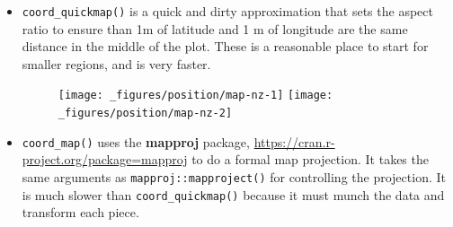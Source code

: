 \begin{itemize}
\item
  \texttt{coord\_quickmap()} is a quick and dirty approximation that
  sets the aspect ratio to ensure than 1m of latitude and 1 m of
  longitude are the same distance in the middle of the plot. These is a
  reasonable place to start for smaller regions, and is very faster.

\begin{Shaded}
\begin{Highlighting}[]
\StringTok{ }\NormalTok{(}\NormalTok{(}\NormalTok{), } 
\StringTok{  }\NormalTok{(} \NormalTok{, } \NormalTok{) +}
\StringTok{  }\NormalTok{(}\NormalTok{) +}\StringTok{ }\NormalTok{(}\NormalTok{)}

\StringTok{ }\NormalTok{()}
\end{Highlighting}
\end{Shaded}

  \begin{figure}[H]
    \centering
    \texttt{[image: \_figures/position/map-nz-1]}%
    \texttt{[image: \_figures/position/map-nz-2]}
  \end{figure}
\item
  \texttt{coord\_map()} uses the \textbf{mapproj} package,
  \url{https://cran.r-project.org/package=mapproj} to do a formal map
  projection. It takes the same arguments as
  \texttt{mapproj::mapproject()} for controlling the projection. It is
  much slower than \texttt{coord\_quickmap()} because it must munch the
  data and transform each piece.

\begin{Shaded}
\begin{Highlighting}[]
\StringTok{ }\NormalTok{(}\NormalTok{)}
\StringTok{ } 
\StringTok{  }\NormalTok{() +}
\StringTok{  }\NormalTok{(}\NormalTok{, } \NormalTok{(-}\NormalTok{:}\NormalTok{) *}\StringTok{ }\NormalTok{, } \NormalTok{) +}
\StringTok{  }\NormalTok{(}\NormalTok{, } \NormalTok{(-}\NormalTok{:}\NormalTok{) *}\StringTok{ }\NormalTok{, } \NormalTok{)}


\end{Highlighting}
\end{Shaded}
\end{itemize}
